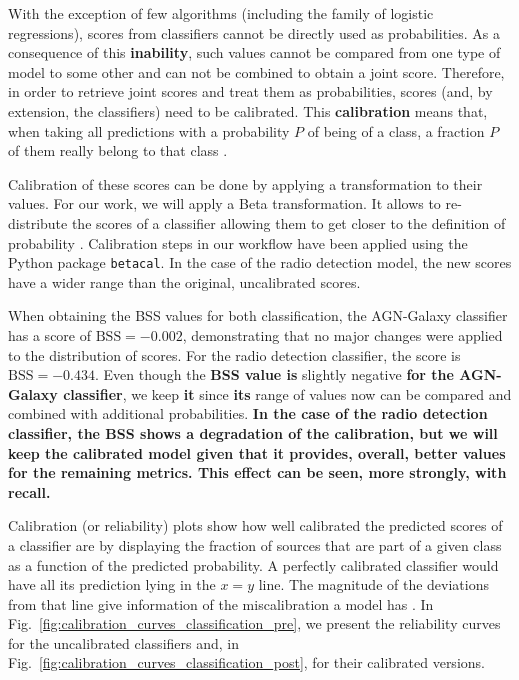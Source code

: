 \documentclass{aa}
\begin{document}
\begin{appendix}
With the exception of few algorithms (including the family of logistic regressions), scores from classifiers cannot be directly used as probabilities. As a consequence of this \textbf{inability}, such values cannot be compared from one type of model to some other and can not be combined to obtain a joint score.
Therefore, in order to retrieve joint scores and treat them as probabilities, scores (and, by extension, the classifiers) need to be calibrated. This \textbf{calibration} means that, when taking all predictions with a probability $P$ of being of a class, a fraction $P$ of them really belong to that class \citep[e.g.][]{lichtenstein_1982, 2021arXiv211210327S}.

Calibration of these scores can be done by applying a transformation to their values. For our work, we will apply a Beta transformation. It allows to re-distribute the scores of a classifier allowing them to get closer to the definition of probability \citep{10.1214/17-EJS1338SI, pmlr-v54-kull17a}. Calibration steps in our workflow have been applied using the Python package \verb|betacal|. In the case of the radio detection model, the new scores have a wider range than the original, uncalibrated scores.%

When obtaining the BSS values for both classification, the AGN-Galaxy classifier has a score of ${\mathrm{BSS} = -0.002}$, demonstrating that no major changes were applied to the distribution of scores. For the radio detection classifier, the score is ${\mathrm{BSS} = -0.434}$. Even though the \textbf{BSS value is} slightly negative \textbf{for the AGN-Galaxy classifier}, we keep \textbf{it} since \textbf{its} range of values now can be compared and combined with additional probabilities. \textbf{In the case of the radio detection classifier, the BSS shows a degradation of the calibration, but we will keep the calibrated model given that it provides, overall, better values for the remaining metrics. This effect can be seen, more strongly, with recall.}

Calibration (or reliability) plots show how well calibrated the predicted scores of a classifier are by displaying the fraction of sources that are part of a given class as a function of the predicted probability. A perfectly calibrated classifier would have all its prediction lying in the ${x{=}y}$ line. The magnitude of the deviations from that line give information of the miscalibration a model has \citep[see, for instance,][]{ReliabilityofReliabilityDiagrams, VanCalster2019}. In Fig.~\ref{fig:calibration_curves_classification_pre}, we present the reliability curves for the uncalibrated classifiers and, in Fig.~\ref{fig:calibration_curves_classification_post}, for their calibrated versions.


\end{appendix}
\end{document}
